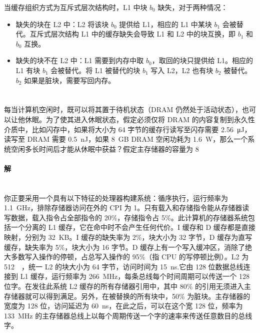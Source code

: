 \documentclass{article}
\begin{document}
当缓存组织方式为互斥式层次结构时，L1 中块 $b_0$ 缺失，对于两种情况：
\begin{itemize}
    \item 缺失的块在 L2 中：L2 将该块 $b_0$ 提供给 L1，相应的 L1 中某块 $b_1$ 会被替代。互斥式层次结构 L1 中的缓存缺失会导致 L1 和 L2 中的块互换，即 $b_1$ 和 $b_0$ 互换。
    \item 缺失的块不在 L2 中：L1 需要到内存中取 $b_0$，取回的块只提供给 L1。相应的 L1 有块 $b_1$ 会被替代。将 L1 被替代的块 $b_1$ 写入 L2，L2 也有块 $b_2$ 被替代。$b_2$ 如果是脏块，需要写回内存。
\end{itemize}
\section{}
每当计算机空闲时，既可以将其置于待机状态（DRAM 仍然处于活动状态），也可以让他休眠。为了使其进入休眠状态，假定必须仅将 DRAM 的内容复制到永久性介质中，比如闪存中，如果将大小为 64 字节的缓存行读写至闪存需要 \SI{2.56}{\micro\joule}，读写至 DRAM 需要 \SI{0.5}{\nano\joule}，如果 \SI{8}{GB} DRAM 空闲功耗为 \SI{1.6}{\watt}，那么一个系统空闲多长时间后才能从休眠中获益？假定主存储器的容量为 \SI{8}{\giga\byte}


\paragraph{解}


\section{}
你正要采用一个具有以下特征的处理器构建系统：循序执行，运行频率为 \SI{1.1}{\giga\hertz}，排除存储器访问在外的 CPI 为 1。只有载入和存储指令能从存储器读写数据，载入指令占全部指令的 20\%，存储指令占 5\%。此计算机的存储器系统包括一个分离的 L1 缓存，它在命中时不会产生任何代价。I 缓存和 D 缓存都是直接映射，分别为 \SI{32}{KB}。I 缓存的缺失率为 2\%，块大小为 32 字节，D 缓存为直写缓存，缺失率为 5\%，块大小为 16 字节。D 缓存上有一个写入缓冲区，消除了绝大多数写入操作的停顿，占总写入操作的 95\%（指 CPU 的写停顿比例）。L2 为 \SI{512}{\kilo\byte}，统一 L2 的块大小为 64 字节，访问时间为 \SI{15}{\nano\second}.它由 128 位数据总线连接到 L1 缓存，运行频率为 \SI{266}{\mega\hertz}，每条总线每个时间周期可以传送一个 128 位字。在发往此系统 L2 缓存的所有存储器引用中，其中 80\% 的引用无须进入主存储器就可以得到满足。另外，在被替换的所有块中，50\% 为脏块。主存储器的宽度为 128 位，访问延迟为 \SI{60}{\nano\second}，在此之后，可以在这个宽 128 位，频率为 \SI{133}{\mega\hertz} 的主存储器总线上以每个周期传送一个字的速率来传送任意数目的总线字。
\end{document}
